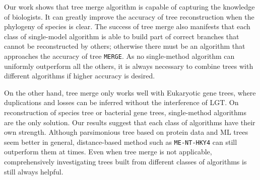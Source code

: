 Our work shows that tree merge algorithm is capable of
capturing the knowledge of biologists. It can greatly improve the accuracy of tree
reconstruction when the phylogeny of species is clear.
The success of tree merge also manifests that each class of single-model algorithm is able to build
part of correct branches that cannot be reconstructed by others; otherwise there must be
an algorithm that approaches the accuracy of tree {\tt MERGE}. As no single-method
algorithm can uniformly outperform all the others, it is always necessary to
combine trees with different algorithms if higher accuracy is desired.

On the other hand, tree merge only works well with Eukaryotic gene trees, where duplications
and losses can be inferred without the interference of LGT. On reconstruction of
species tree or bacterial gene trees, single-method algorithms are the only solution.
Our results suggest that each class of algorithms have their own strength. Although
parsimonious tree based on protein data and ML trees seem better in general,
distance-based method such as {\tt ME-NT-HKY4} can still outperform them at times.
Even when tree merge is not applicable, comprehensively investigating trees built
from different classes of algorithms is still always helpful.
